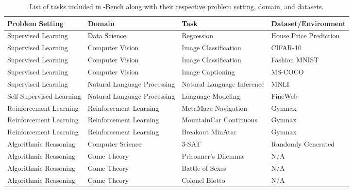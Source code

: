 \begin{table}[!h]
    \centering
    \begin{adjustbox}{width=\textwidth}
    \begin{NiceTabular}{llll}
        \toprule
        Problem Setting & Domain & Task & Dataset/Environment \\
        \midrule
        Supervised Learning & Data Science & Regression & House Price Prediction \\
        \midrule
        Supervised Learning & Computer Vision & Image Classification & CIFAR-10~\citep{krizhevsky2009learning} \\
        Supervised Learning & Computer Vision & Image Classification & Fashion MNIST~\citep{xiao2017/online} \\
        Supervised Learning & Computer Vision & Image Captioning & MS-COCO~\citep{lin2014microsoft}  \\
        \midrule
        Supervised Learning & Natural Language Processing & Natural Language Inference & MNLI~\citep{williams2018multi}  \\
        Self-Supervised Learning & Natural Language Processing & Language Modeling & FineWeb~\citep{penedo2024finewebdatasetsdecantingweb}  \\
        \midrule
        Reinforcement Learning & Reinforcement Learning & MetaMaze Navigation & Gymnax~\citep{gymnax2022github} \\
        Reinforcement Learning & Reinforcement Learning & MountainCar Continuous & Gymnax~\citep{gymnax2022github} \\
        Reinforcement Learning & Reinforcement Learning & Breakout MinAtar &  Gymnax~\citep{gymnax2022github}
        \\
        \midrule
        Algorithmic Reasoning  & Computer Science & 3-SAT & Randomly Generated~\citep{selsam2018satAlgorithm} \\ 
        \midrule
        Algorithmic Reasoning  & Game Theory & Prisonner's Dilemma & N/A\\
        Algorithmic Reasoning  & Game Theory & Battle of Sexes & N/A \\
        Algorithmic Reasoning  &  Game Theory & Colonel Blotto & N/A \\
        \bottomrule
    \end{NiceTabular}
    \end{adjustbox}
    \caption{List of tasks included in \mlgym-Bench along with their respective problem setting, domain, and datasets.}
    \label{tab:aup_scores}
\end{table}


